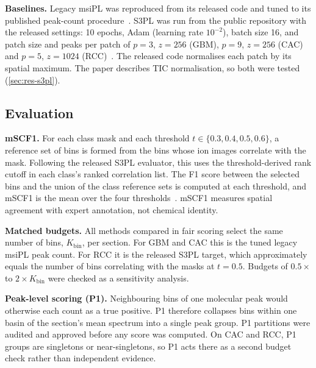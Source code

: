 \textbf{Baselines.} Legacy msiPL was reproduced from its released code and
tuned to its published peak-count procedure~\citep{abdelmoula2021peak}. S3PL
was run from the public repository with the released settings: 10 epochs, Adam
(learning rate $10^{-2}$), batch size 16, and patch size and peaks per patch of $p=3$, $z=256$ (GBM),
$p=9$, $z=256$ (CAC) and $p=5$, $z=1024$ (RCC)~\citep{weigand2026spatial}. The released code normalises each
patch by its spatial maximum. The paper describes TIC normalisation, so both
were tested (\cref{sec:res-s3pl}).

\subsection{Evaluation}
\label{sec:evaluation}
\textbf{mSCF1.} For each class mask and each threshold
$t\in\{0.3,0.4,0.5,0.6\}$, a reference set of bins is formed from the bins
whose ion images correlate with the mask. Following the released S3PL
evaluator, this uses the threshold-derived rank cutoff in each class's ranked
correlation list. The F1 score between the selected bins and the union of the
class reference sets is computed at each threshold, and mSCF1 is the mean over
the four thresholds~\citep{weigand2026spatial}. mSCF1 measures spatial
agreement with expert annotation, not chemical identity.

\textbf{Matched budgets.} All methods compared in fair scoring select the same
number of bins, $K_{\text{bin}}$, per section. For GBM and CAC this is the
tuned legacy msiPL peak count. For RCC it is the released S3PL target, which
approximately equals the number of bins correlating with the masks at
$t=0.5$. Budgets of $0.5\times$ to $2\times K_{\text{bin}}$ were checked as a
sensitivity analysis.

\textbf{Peak-level scoring (P1).} Neighbouring bins of one molecular peak
would otherwise each count as a true positive. P1 therefore collapses bins
within one basin of the section's mean spectrum into a single peak group.
P1 partitions were audited and approved before any score was computed.
On CAC and RCC, P1 groups are singletons or near-singletons, so P1 acts there
as a second budget check rather than independent evidence.

